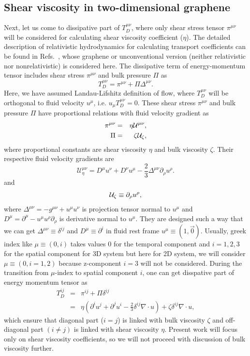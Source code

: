 \documentclass[%
 reprint,
 amsmath,amssymb,
 aps,
]{revtex4-2}
\newcommand{\be}{\begin{equation}}
\newcommand{\ee}{\end{equation}}
\newcommand{\bea}{\begin{eqnarray}}
\newcommand{\eea}{\end{eqnarray}}
\newcommand{\nn}{\nonumber}
\newcommand{\del}{\partial}
\begin{document}
    \subsection{Shear viscosity in two-dimensional graphene}
    Next, let us come to dissipative part of $T_D^{\mu\nu}$, where only shear stress tensor $\pi^{\mu\nu}$ will be considered for calculating shear viscosity coefficient ($\eta$). The detailed description of relativistic hydrodynamics for calculating transport coefficients can be found in Refs.~\cite{QGP1,QGP3,QGP8},
    whose graphene or unconventional version (neither relativistic nor nonrelativistic) is considered here.
    The dissipative term of energy-momentum tensor includes shear stress $\pi^{\mu\nu}$ and bulk pressure $\Pi$ as
    \be
    T^{\mu\nu}_D = \pi^{\mu\nu}+ \Pi \Delta^{\mu\nu}.
    \ee
    Here, we have assumed Landau-Lifshitz definition of flow, where $T^{\mu\nu}_D$ will be orthogonal to fluid velocity $u^\mu$, i.e. $u_\mu T^{\mu\nu}_D=0$.
    These shear stress $\pi^{\mu\nu}$ and bulk pressure $\Pi$ have proportional relations with fluid velocity gradient as
    \bea
    \pi^{\mu\nu} &=& \eta \mathcal{U}^{\mu\nu},
    \nn\\
    \Pi &=&\zeta {\cal U}_\zeta,
    \eea 
    where proportional constants are shear viscosity $\eta$ and bulk viscosity $\zeta$. Their respective fluid velocity gradients are 
    \be 
    \mathcal{U}^{\mu\nu}_\eta= D^\mu u^{\nu} +D^\nu u^{\mu} - \frac{2}{3} \Delta^{\mu\nu} \del_\rho u^\rho.
    \label{u_em1}
    \ee 
    and 
    \be 
    {\cal U}_\zeta \equiv \del_\rho u^\rho,
    \ee 
    where $\Delta^{\mu\nu}=-g^{\mu\nu}+u^\mu u^\nu$ is projection tensor normal to $u^\mu$
    and $D^\mu=\del^\mu - u^\mu u^\rho \del_\rho$ is derivative normal to $u^\mu$. They are designed
    such a way that we can get $\Delta^{\mu\nu}\equiv \delta^{ij}$ and $D^\mu\equiv \del^i$ in fluid rest frame $u^{\mu}\equiv (1, {\vec 0})$.
    Usually, greek index like $\mu\equiv(0,i)$ takes values 0 for the temporal component and $i=1,2,3$ for the spatial component for 3D system but here for 2D system, we will consider $\mu\equiv(0,i=1,2)$ because z-component $i=3$ will not be considered.
    During the transition from $\mu$-index to spatial component $i$, one can get disspative part of energy momentum tensor
    as
    \bea
    T^{ij}_D &=& \pi^{ij}+ \Pi \delta^{ij}
    \nn\\
    &=& \eta (\del^i u^j +\del^j u^i -\frac{2}{3}\delta^{ij}\nabla \cdot u)+\zeta \delta^{ij}\nabla \cdot u,
    \eea
    which ensure that diagonal part ($i=j$) is linked with bulk viscosity $\zeta$ and off-diagonal part $(i\neq j)$
    is linked with shear viscosity $\eta$. Present work will focus only on shear viscosity coefficients, so 
    we will not proceed with discussion of bulk viscosity further.
    
\end{document}
